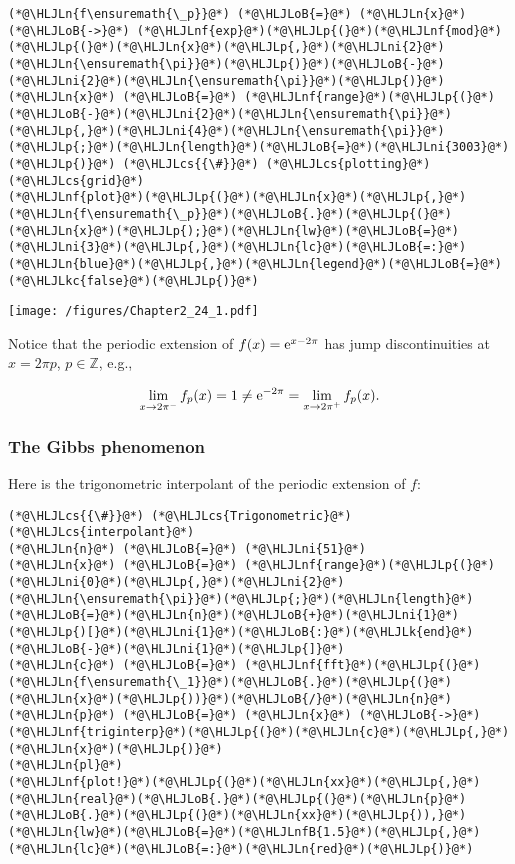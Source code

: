 \documentclass[12pt,landscape]{article}
\newcommand{\HLJLk}[1]{\textcolor[RGB]{148,91,176}{\textbf{#1}}}
\newcommand{\HLJLkc}[1]{\textcolor[RGB]{59,151,46}{\textit{#1}}}
\newcommand{\HLJLn}[1]{#1}
\newcommand{\HLJLnf}[1]{\textcolor[RGB]{66,102,213}{#1}}
\newcommand{\HLJLnfB}[1]{\textcolor[RGB]{59,151,46}{#1}}
\newcommand{\HLJLni}[1]{\textcolor[RGB]{59,151,46}{#1}}
\newcommand{\HLJLoB}[1]{\textcolor[RGB]{102,102,102}{\textbf{#1}}}
\newcommand{\HLJLp}[1]{#1}
\newcommand{\HLJLcs}[1]{\textcolor[RGB]{153,153,119}{\textit{#1}}}
\begin{document}
{\begin{lstlisting}
(*@\HLJLn{f\ensuremath{\_p}}@*) (*@\HLJLoB{=}@*) (*@\HLJLn{x}@*) (*@\HLJLoB{->}@*) (*@\HLJLnf{exp}@*)(*@\HLJLp{(}@*)(*@\HLJLnf{mod}@*)(*@\HLJLp{(}@*)(*@\HLJLn{x}@*)(*@\HLJLp{,}@*)(*@\HLJLni{2}@*)(*@\HLJLn{\ensuremath{\pi}}@*)(*@\HLJLp{)}@*)(*@\HLJLoB{-}@*)(*@\HLJLni{2}@*)(*@\HLJLn{\ensuremath{\pi}}@*)(*@\HLJLp{)}@*)
(*@\HLJLn{x}@*) (*@\HLJLoB{=}@*) (*@\HLJLnf{range}@*)(*@\HLJLp{(}@*)(*@\HLJLoB{-}@*)(*@\HLJLni{2}@*)(*@\HLJLn{\ensuremath{\pi}}@*)(*@\HLJLp{,}@*)(*@\HLJLni{4}@*)(*@\HLJLn{\ensuremath{\pi}}@*)(*@\HLJLp{;}@*)(*@\HLJLn{length}@*)(*@\HLJLoB{=}@*)(*@\HLJLni{3003}@*)(*@\HLJLp{)}@*) (*@\HLJLcs{{\#}}@*) (*@\HLJLcs{plotting}@*) (*@\HLJLcs{grid}@*)
(*@\HLJLnf{plot}@*)(*@\HLJLp{(}@*)(*@\HLJLn{x}@*)(*@\HLJLp{,}@*)(*@\HLJLn{f\ensuremath{\_p}}@*)(*@\HLJLoB{.}@*)(*@\HLJLp{(}@*)(*@\HLJLn{x}@*)(*@\HLJLp{);}@*)(*@\HLJLn{lw}@*)(*@\HLJLoB{=}@*)(*@\HLJLni{3}@*)(*@\HLJLp{,}@*)(*@\HLJLn{lc}@*)(*@\HLJLoB{=:}@*)(*@\HLJLn{blue}@*)(*@\HLJLp{,}@*)(*@\HLJLn{legend}@*)(*@\HLJLoB{=}@*)(*@\HLJLkc{false}@*)(*@\HLJLp{)}@*)
\end{lstlisting}

\texttt{[image: /figures/Chapter2\_24\_1.pdf]}

Notice that the periodic extension of $f(x) = {\rm e}^{x-2\pi}$ has jump discontinuities at $x = 2\pi p$, $p \in \mathbb{Z}$, e.g., 

\[
\lim_{x \to 2\pi^{-}} f_p(x) = 1 \neq {\rm e}^{-2\pi} = \lim_{x \to 2\pi^{+}} f_p(x).
\]
\subsubsection{The Gibbs phenomenon}
Here is the trigonometric interpolant of the periodic extension of $f$:


\begin{lstlisting}
(*@\HLJLcs{{\#}}@*) (*@\HLJLcs{Trigonometric}@*) (*@\HLJLcs{interpolant}@*)
(*@\HLJLn{n}@*) (*@\HLJLoB{=}@*) (*@\HLJLni{51}@*)
(*@\HLJLn{x}@*) (*@\HLJLoB{=}@*) (*@\HLJLnf{range}@*)(*@\HLJLp{(}@*)(*@\HLJLni{0}@*)(*@\HLJLp{,}@*)(*@\HLJLni{2}@*)(*@\HLJLn{\ensuremath{\pi}}@*)(*@\HLJLp{;}@*)(*@\HLJLn{length}@*)(*@\HLJLoB{=}@*)(*@\HLJLn{n}@*)(*@\HLJLoB{+}@*)(*@\HLJLni{1}@*)(*@\HLJLp{)[}@*)(*@\HLJLni{1}@*)(*@\HLJLoB{:}@*)(*@\HLJLk{end}@*)(*@\HLJLoB{-}@*)(*@\HLJLni{1}@*)(*@\HLJLp{]}@*)
(*@\HLJLn{c}@*) (*@\HLJLoB{=}@*) (*@\HLJLnf{fft}@*)(*@\HLJLp{(}@*)(*@\HLJLn{f\ensuremath{\_1}}@*)(*@\HLJLoB{.}@*)(*@\HLJLp{(}@*)(*@\HLJLn{x}@*)(*@\HLJLp{))}@*)(*@\HLJLoB{/}@*)(*@\HLJLn{n}@*)
(*@\HLJLn{p}@*) (*@\HLJLoB{=}@*) (*@\HLJLn{x}@*) (*@\HLJLoB{->}@*) (*@\HLJLnf{triginterp}@*)(*@\HLJLp{(}@*)(*@\HLJLn{c}@*)(*@\HLJLp{,}@*) (*@\HLJLn{x}@*)(*@\HLJLp{)}@*)
(*@\HLJLn{pl}@*)  
(*@\HLJLnf{plot!}@*)(*@\HLJLp{(}@*)(*@\HLJLn{xx}@*)(*@\HLJLp{,}@*)(*@\HLJLn{real}@*)(*@\HLJLoB{.}@*)(*@\HLJLp{(}@*)(*@\HLJLn{p}@*)(*@\HLJLoB{.}@*)(*@\HLJLp{(}@*)(*@\HLJLn{xx}@*)(*@\HLJLp{)),}@*)(*@\HLJLn{lw}@*)(*@\HLJLoB{=}@*)(*@\HLJLnfB{1.5}@*)(*@\HLJLp{,}@*)(*@\HLJLn{lc}@*)(*@\HLJLoB{=:}@*)(*@\HLJLn{red}@*)(*@\HLJLp{)}@*)
\end{lstlisting}

}
\end{document}
